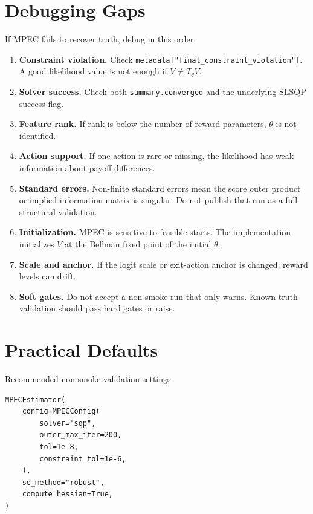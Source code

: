 \documentclass[10pt]{article}
\begin{document}


\section{Debugging Gaps}

If MPEC fails to recover truth, debug in this order.

\begin{enumerate}
\item \textbf{Constraint violation.} Check
\texttt{metadata["final\_constraint\_violation"]}. A good likelihood value is
not enough if \(V\neq T_\theta V\).
\item \textbf{Solver success.} Check both \texttt{summary.converged} and the
underlying SLSQP success flag.
\item \textbf{Feature rank.} If rank is below the number of reward parameters,
\(\theta\) is not identified.
\item \textbf{Action support.} If one action is rare or missing, the
likelihood has weak information about payoff differences.
\item \textbf{Standard errors.} Non-finite standard errors mean the score
outer product or implied information matrix is singular. Do not publish that
run as a full structural validation.
\item \textbf{Initialization.} MPEC is sensitive to feasible starts. The
implementation initializes \(V\) at the Bellman fixed point of the initial
\(\theta\).
\item \textbf{Scale and anchor.} If the logit scale or exit-action anchor is
changed, reward levels can drift.
\item \textbf{Soft gates.} Do not accept a non-smoke run that only warns.
Known-truth validation should pass hard gates or raise.
\end{enumerate}

\section{Practical Defaults}

Recommended non-smoke validation settings:

\begin{lstlisting}
MPECEstimator(
    config=MPECConfig(
        solver="sqp",
        outer_max_iter=200,
        tol=1e-8,
        constraint_tol=1e-6,
    ),
    se_method="robust",
    compute_hessian=True,
)
\end{lstlisting}
\end{document}
